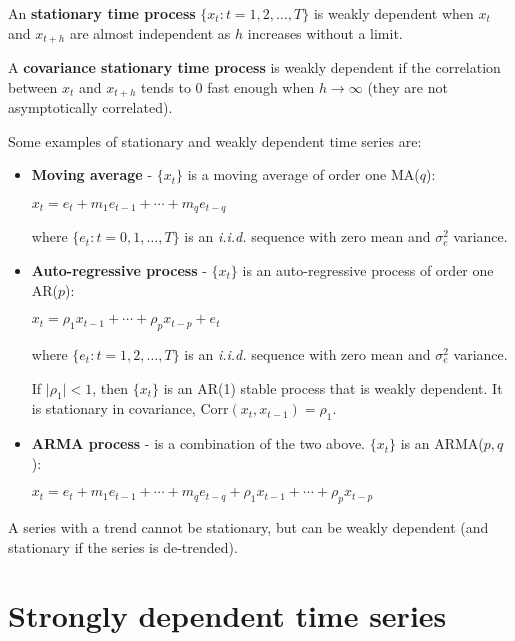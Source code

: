 \documentclass[10pt, a4paper, landscape]{extarticle}
\newcommand{\Corr}{\mathrm{Corr}}
\begin{document}
\begin{multicols}{3}
An \textbf{stationary time process} $\lbrace x_t : t = 1, 2, \ldots, T \rbrace$ is weakly dependent when $x_t$ and $x_{t + h}$ are almost independent as $h$ increases without a limit.

A \textbf{covariance stationary time process} is weakly dependent if the correlation between $x_t$ and $x_{t + h}$ tends to $0$ fast enough when $h \rightarrow \infty$ (they are not asymptotically correlated).

Some examples of stationary and weakly dependent time series are:

\begin{itemize}[leftmargin=*]
	\item \textbf{Moving average} - $\lbrace x_t \rbrace$ is a moving average of order one MA($q$):
	\begin{center}
		$x_t = e_t + m_1 e_{t - 1} + \cdots + m_q e_{t - q}$
	\end{center}
	where $\lbrace e_t : t = 0, 1, \ldots, T \rbrace$ is an \textsl{i.i.d.} sequence with zero mean and $\sigma^2_e$ variance.
	\item \textbf{Auto-regressive process} - $\lbrace x_t \rbrace$ is an auto-regressive process of order one AR($p$):
	\begin{center}
		$x_t = \rho_1 x_{t - 1} + \cdots + \rho_p x_{t - p} + e_t$
	\end{center}
	where $\lbrace e_t : t = 1, 2, \ldots, T \rbrace$ is an \textsl{i.i.d.} sequence with zero mean and $\sigma^2_e$ variance.

	If $\lvert \rho_1 \rvert < 1$, then $\lbrace x_t \rbrace$ is an AR(1) stable process that is weakly dependent. It is stationary in covariance, $\Corr(x_t, x_{t - 1}) = \rho_1$.
	\item \textbf{ARMA process} - is a combination of the two above. $\lbrace x_t \rbrace$ is an ARMA($p, q$):
	\begin{center}
		$x_t = e_t + m_1 e_{t - 1} + \cdots + m_q e_{t - q} + \rho_1 x_{t - 1} + \cdots + \rho_p x_{t - p}$
	\end{center}
\end{itemize}

A series with a trend cannot be stationary, but can be weakly dependent (and stationary if the series is de-trended).

\columnbreak

\section*{Strongly dependent time series}


\end{multicols}
\end{document}
